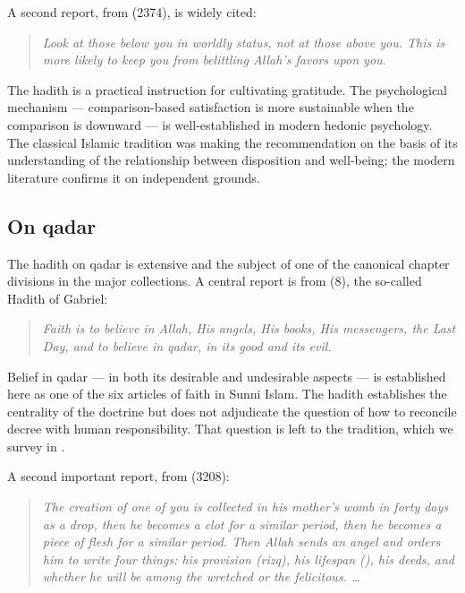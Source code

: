 A second report, from  (2374), is widely cited:

\begin{quote}
\textit{Look at those below you in worldly status, not at those
above you. This is more likely to keep you from belittling Allah's
favors upon you.}
\end{quote}

The hadith is a practical instruction for cultivating gratitude. The
psychological mechanism --- comparison-based satisfaction is more
sustainable when the comparison is downward --- is well-established
in modern hedonic psychology. The classical Islamic tradition was
making the recommendation on the basis of its understanding of the
relationship between disposition and well-being; the modern
literature confirms it on independent grounds.

\subsection{On qadar}

The hadith on qadar is extensive and the subject of one of the
canonical chapter divisions in the major collections. A central
report is from  (8), the so-called Hadith of
Gabriel:

\begin{quote}
\textit{Faith is to believe in Allah, His angels, His books, His
messengers, the Last Day, and to believe in qadar, in its good and
its evil.}
\end{quote}

Belief in qadar --- in both its desirable and undesirable aspects ---
is established here as one of the six articles of faith in Sunni
Islam. The hadith establishes the centrality of the doctrine but
does not adjudicate the question of how to reconcile decree with
human responsibility. That question is left to the 
tradition, which we survey in .

A second important report, from  (3208):

\begin{quote}
\textit{The creation of one of you is collected in his mother's womb
in forty days as a drop, then he becomes a clot for a similar
period, then he becomes a piece of flesh for a similar period. Then
Allah sends an angel and orders him to write four things: his
provision (rizq), his lifespan (), his deeds, and
whether he will be among the wretched or the felicitous. \dots}
\end{quote}

